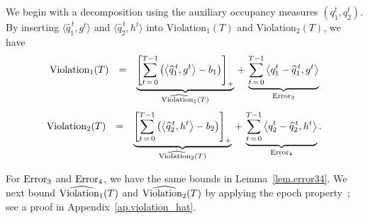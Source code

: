 \documentclass[12pt, final]{l4dc2023}
\begin{document}
We begin with a decomposition using the auxiliary occupancy measures $(q_1^t, q_2^t)$. By inserting $\langle \hat q_1^{\,t},g^{t}\rangle$ and $\langle \hat q_2^{\,t},h^{t}\rangle$ into $\text{Violation}_1(T) $ and $\text{Violation}_2(T) $, we have
\[
\begin{array}{rcl}
\text{Violation}_1(T) 
&=&
\underbrace{\sbr{\sum_{t\,=\,0}^{T-1} \rbr{\inner{\hat q_1^{\,t}}{g^t}-b_1}}_+}_{\hat{\text{\normalfont Violation}_1}(T)}
\,+\,
\underbrace{
	\sum_{t\,=\,0}^{T-1} \inner{q_1^t-\hat q_1^{\,t}}{g^t}
}_{\text{\normalfont Error}_3}
\end{array}
\]
\[
\begin{array}{rcl}
\text{Violation}_2(T) 
&=&
\underbrace{\sbr{\sum_{t\,=\,0}^{T-1} \rbr{\inner{\hat q_2^{\,t}}{h^t}-b_2}}_+}_{\hat{\text{\normalfont Violation}_2}(T)}
\, + \,
\underbrace{
	\sum_{t\,=\,0}^{T-1}\inner{q_2^t-\hat q_2^{\,t}}{h^t}
}_{\text{\normalfont Error}_4}.
\end{array}
\]

For ${\text{\normalfont Error}_3}$ and ${\text{\normalfont Error}_4}$, we have the same bounds in Lemma~\ref{lem.error34}.
We next bound ${\hat{\text{\normalfont Violation}_1}(T)}$ and ${\hat{\text{\normalfont Violation}_2}(T)}$ by applying the epoch property~\citep{jaksch2010near}; see a proof in Appendix~\ref{ap.violation_hat}.
\end{document}
